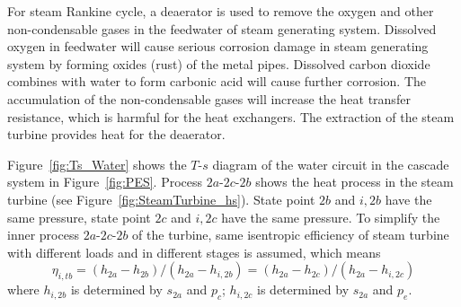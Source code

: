   For steam Rankine cycle, a deaerator is used to remove the oxygen and other non-condensable gases in the feedwater of steam generating system. Dissolved oxygen in feedwater will cause serious corrosion damage in steam generating system by forming oxides (rust) of the metal pipes. Dissolved carbon dioxide combines with water to form carbonic acid will cause further corrosion. The accumulation of the non-condensable gases will increase the heat transfer resistance, which is harmful for the heat exchangers. The extraction of the steam turbine provides heat for the deaerator.
  
  Figure~\ref{fig:Ts_Water} shows the $T$-$s$ diagram of the water circuit in the cascade system in Figure~\ref{fig:PES}. Process $2a$-$2c$-$2b$ shows the heat process in the steam turbine (see Figure~\ref{fig:SteamTurbine_hs}). State point $2b$ and $i,2b$ have the same pressure, state point $2c$ and $i,2c$ have the same pressure. To simplify the inner process $2a$-$2c$-$2b$ of the turbine, same isentropic efficiency of steam turbine with different loads and in different stages is assumed, which means  
  \begin{equation}
      \eta_{i,tb} =(h_{2a}-h_{2b})/(h_{2a}-h_{i,2b}) = (h_{2a}-h_{2c})/(h_{2a}-h_{i,2c})
\end{equation}
where $h_{i,2b}$ is determined by $s_{2a}$ and $p_c$; $h_{i,2c}$ is determined by $s_{2a}$ and $p_e$.

